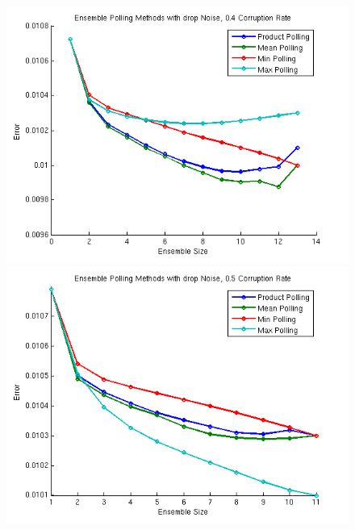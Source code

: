 \documentclass{article} %
\begin{document}
\begin{figure}[ht] 
  \label{fig:PollingMethods2} 
  \begin{minipage}[b]{0.5\linewidth}
    \centering
    \includegraphics[width=\linewidth]{methods8a} 
    \vspace{4ex}
  \end{minipage}%
  \begin{minipage}[b]{0.5\linewidth}
    \centering
    \includegraphics[width=\linewidth]{methods7a} 
    \vspace{4ex}
  \end{minipage} 
  \begin{minipage}[b]{0.5\linewidth}

\end{minipage}
\end{figure}
\end{document}
